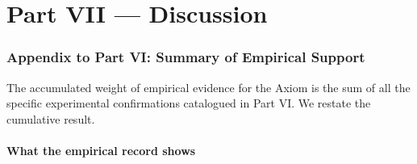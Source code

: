 \documentclass[11pt,twocolumn,a4paper]{article}
\theoremstyle{axiomstyle}
\theoremstyle{conseqstyle}
\theoremstyle{definition}
\theoremstyle{remark}
\begin{document}
\part*{Part VII --- Discussion}

\section*{Appendix to Part VI: Summary of Empirical Support}

The accumulated weight of empirical evidence for the Axiom is the sum of all the specific experimental confirmations catalogued in Part VI. We restate the cumulative result.

\subsection{What the empirical record shows}
\end{document}
